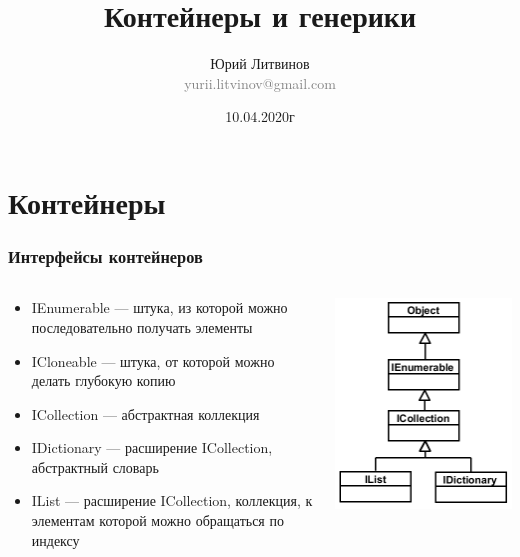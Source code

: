 \documentclass[xetex,mathserif,serif]{beamer}
\title{Контейнеры и генерики}
\author[Юрий Литвинов]{Юрий Литвинов\\\small{\textcolor{gray}{yurii.litvinov@gmail.com}}}
\date{10.04.2020г}
\begin{document}
	\frame{\titlepage}

	\section{Контейнеры}

	\begin{frame}
		\frametitle{Интерфейсы контейнеров}
		\begin{columns}
			\begin{column}{0.65\textwidth}
				\begin{itemize}
					\item IEnumerable --- штука, из которой можно последовательно получать элементы
					\item ICloneable --- штука, от которой можно делать глубокую копию
					\item ICollection --- абстрактная коллекция
					\item IDictionary --- расширение ICollection, абстрактный словарь
					\item IList --- расширение ICollection, коллекция, к элементам которой можно обращаться по индексу
				\end{itemize}
			\end{column}
			\begin{column}{0.3\textwidth}
				\includegraphics[width=\textwidth]{interfaces.png}
			\end{column}
		\end{columns}
	\end{frame}
\end{document}
